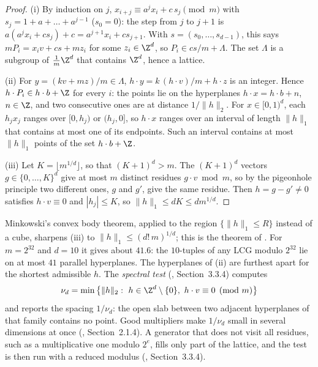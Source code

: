 \begin{proof}
(i) By induction on $j$, $x_{i+j}\equiv a^jx_i+c\,s_j\pmod m$ with
$s_j=1+a+\dots+a^{j-1}$ ($s_0=0$): the step from $j$ to $j+1$ is
$a(a^jx_i+cs_j)+c=a^{j+1}x_i+cs_{j+1}$. With $s=(s_0,\dots,s_{d-1})$, this says
$mP_i=x_iv+cs+mz_i$ for some $z_i\in\Z^d$, so $P_i\in cs/m+\Lambda$. The set $\Lambda$ is
a subgroup of $\frac1m\Z^d$ that contains $\Z^d$, hence a lattice.

(ii) For $y=(kv+mz)/m\in\Lambda$, $h\cdot y=k\,(h\cdot v)/m+h\cdot z$ is an integer. Hence
$h\cdot P_i\in h\cdot b+\Z$ for every $i$: the points lie on the hyperplanes
$h\cdot x=h\cdot b+n$, $n\in\Z$, and two consecutive ones are at distance $1/\|h\|_2$. For
$x\in[0,1)^d$, each $h_jx_j$ ranges over $[0,h_j)$ or $(h_j,0]$, so $h\cdot x$ ranges over
an interval of length $\|h\|_1$ that contains at most one of its endpoints. Such an
interval contains at most $\|h\|_1$ points of the set $h\cdot b+\Z$.

(iii) Let $K=\lfloor m^{1/d}\rfloor$, so that $(K+1)^d>m$. The $(K+1)^d$ vectors
$g\in\{0,\dots,K\}^d$ give at most $m$ distinct residues $g\cdot v\bmod m$, so by the
pigeonhole principle two different ones, $g$ and $g'$, give the same residue. Then
$h=g-g'\ne0$ satisfies $h\cdot v\equiv0$ and $|h_j|\le K$, so $\|h\|_1\le dK\le dm^{1/d}$.
\end{proof}

Minkowski's convex body theorem, applied to the region $\{\|h\|_1\le R\}$ instead of a cube,
sharpens (iii) to $\|h\|_1\le(d!\,m)^{1/d}$; this is the theorem of \textcite{marsaglia-planes}.
For $m=2^{32}$ and $d=10$ it gives about $41.6$: the $10$-tuples of any LCG modulo $2^{32}$
lie on at most $41$ parallel hyperplanes. The hyperplanes of (ii) are furthest apart for the
shortest admissible $h$. The \emph{spectral test} (\textcite{knuth-taocp2}, Section~3.3.4)
computes
\[
  \nu_d=\min\big\{\|h\|_2:\ h\in\Z^d\setminus\{0\},\ h\cdot v\equiv0\pmod m\big\}
\]
and reports the spacing $1/\nu_d$: the open slab between two adjacent hyperplanes of that
family contains no point. Good multipliers make $1/\nu_d$ small in several dimensions at once
(\textcite{glasserman-mc}, Section~2.1.4). A generator that does not visit all residues, such as
a multiplicative one modulo $2^e$, fills only part of the lattice, and the test is then run with
a reduced modulus (\textcite{knuth-taocp2}, Section~3.3.4).

